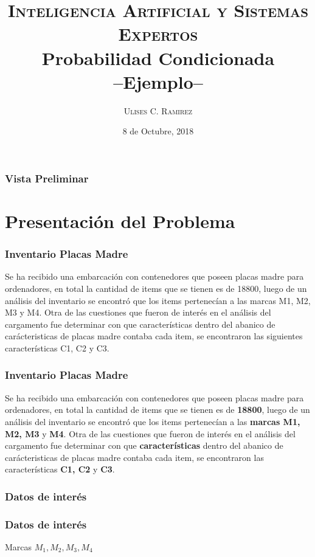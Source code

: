 \documentclass{beamer}
\title[IAySE - 2018]{\textsc{Inteligencia Artificial y Sistemas
Expertos}\\Probabilidad Condicionada\\--Ejemplo--} %
\author{\textsc{Ulises C. Ramirez}
}
\institute[UNaM -- FCEQyN] %
{
\texttt{\{ulir19, ulisescolrez\}@gmail.com}\\
\medskip
Universidad Nacional de Misiones\\Facultad de Ciencias Exactas, Qu\'imicas y
Naturales \\ %
}
\date{8 de Octubre, 2018}
\begin{document}
\begin{frame}
\titlepage %
\end{frame}

\begin{frame}
\frametitle{Vista Preliminar} %
\tableofcontents %
\end{frame}


\section{Presentaci\'on del Problema}
\begin{frame}
\frametitle{Inventario Placas Madre}
Se ha recibido una embarcaci\'on con contenedores que poseen placas madre para
ordenadores, en total la cantidad de items que se tienen es de 18800, luego de
un análisis del inventario se encontró que los items pertenecían a las marcas
M1, M2, M3 y M4. Otra de las cuestiones que fueron de interés en el análisis
del cargamento fue determinar con que características dentro del abanico de carácteristicas
de placas madre contaba cada item, se encontraron las siguientes
características C1, C2 y C3.
\end{frame}
\begin{frame}
\frametitle{Inventario Placas Madre}
Se ha recibido una embarcaci\'on con contenedores que poseen placas madre para
ordenadores, en total la cantidad de items que se tienen es de \textbf{18800},
luego de un análisis del inventario se encontró que los items pertenecían a las \textbf{marcas
M1, M2, M3} y \textbf{M4}. Otra de las cuestiones que fueron de interés en el análisis
del cargamento fue determinar con que \textbf{características} dentro del abanico de carácteristicas
de placas madre contaba cada item, se encontraron las características
\textbf{C1, C2} y \textbf{C3}.
\end{frame}
\begin{frame}
\frametitle{Datos de inter\'es}
\end{frame}
\begin{frame}
\frametitle{Datos de inter\'es}
\begin{block}{Marcas}
$M_{1}, M_{2}, M_{3}, M_{4}$
\end{block}

\end{frame}
\end{document}
